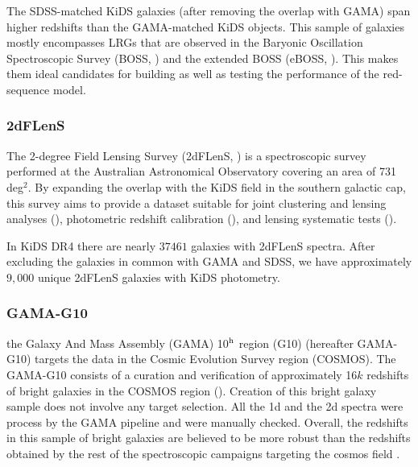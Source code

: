 \documentclass[fleqn,usenatbib,useAMS]{mnras}
\begin{document}
The SDSS-matched KiDS galaxies (after removing the overlap with GAMA) span higher redshifts than the GAMA-matched KiDS objects. This sample of galaxies mostly encompasses LRGs that are observed in the Baryonic Oscillation Spectroscopic Survey (BOSS, \citealt{dawson2013}) and the extended BOSS (eBOSS, \citealt{dawson2016}). This makes them ideal candidates for building as well as testing the performance of the red-sequence model.   

\subsubsection{2dFLenS}
The 2-degree Field Lensing Survey (2dFLenS, \citealt{blake2016}) is a spectroscopic survey performed at the Australian Astronomical Observatory covering an area of 731 deg$^2$. By expanding the overlap with the KiDS field in the southern galactic cap, this survey aims to provide a dataset suitable for joint clustering and lensing analyses (\citealt{amon2018b,joudaki2018}), photometric redshift calibration (\citealt{johnson2017,wolf2017,kids_annz}), and lensing systematic tests (\citealt{amon2018a}).

In KiDS DR4 there are nearly $37461$ galaxies with 2dFLenS spectra. After excluding the galaxies in common with GAMA and SDSS, we have approximately $9,000$ unique 2dFLenS galaxies with KiDS photometry.

\subsubsection{GAMA-G10}

the Galaxy And Mass Assembly (GAMA) 10$^{\rm h}$ region (G10) (hereafter GAMA-G10) targets the data in the Cosmic Evolution Survey region (COSMOS). The GAMA-G10 consists of a curation and verification of approximately 16$k$ redshifts of bright galaxies in the COSMOS region (\citealt{davis2017}). Creation of this bright galaxy sample does not involve any target selection. All the 1d and the 2d spectra were process by the GAMA pipeline and were manually checked. Overall, the redshifts in this sample of bright galaxies are believed to be more robust than the redshifts obtained by the rest of the spectroscopic campaigns targeting the cosmos field \citep[e.g.][]{lily2009}.
\end{document}
